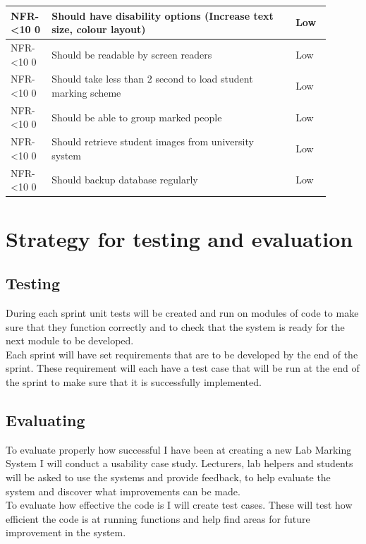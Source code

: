 \documentclass[12pt]{article}  %
\newcommand{\rid}[1]{\centering #1-\ifnum\value{requirement}<10 0\fi\arabic{requirement} \stepcounter{requirement}}
\begin{document}
\begin{spacing}{1.5}
\begin{longtable}{|p{0.1\linewidth}|p{0.7\linewidth}|p{0.1\linewidth}|}
\rid{NFR} & Should have disability options (Increase text size, colour layout) & Low\\ \hline
\rid{NFR} & Should be readable by screen readers & Low\\ \hline
\rid{NFR} & Should take less than 2 second to load student marking scheme & Low\\ \hline
\rid{NFR} & Should be able to group marked people & Low \\ \hline
\rid{NFR} & Should retrieve student images from university system & Low\\ \hline
\rid{NFR} & Should backup database regularly & Low\\ \hline


\end{longtable}
\end{spacing}


\setcounter{requirement}{1}




\newpage


\section{Strategy for testing and evaluation}


\subsection{Testing}
During each sprint unit tests will be created and run on modules of code to make sure that they function correctly and to check that the system is ready for the next module to be developed.\\
Each sprint will have set requirements that are to be developed by the end of the sprint. These requirement will each have a test case that will be run at the end of the sprint to make sure that it is successfully implemented.


\subsection{Evaluating}
To evaluate properly how successful I have been at creating a new Lab Marking System I will conduct a usability case study. Lecturers, lab helpers and students will be asked to use the systems and provide feedback, to help evaluate the system and discover what improvements can be made.\\
To evaluate how effective the code is I will create test cases. These will test how efficient the code is at running functions and help find areas for future improvement in the system.
\end{document}

